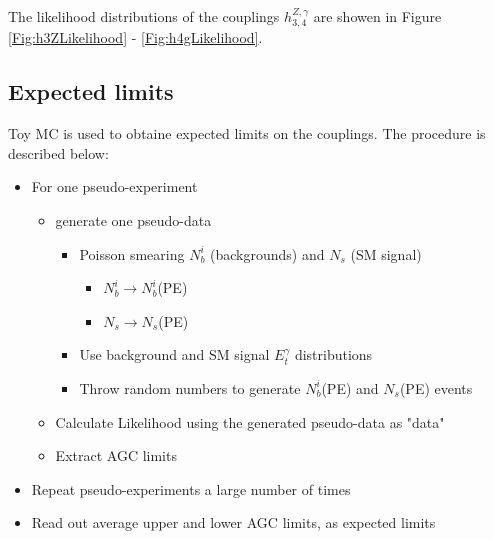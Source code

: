 \documentclass[12pt,twoside,letterpaper]{article}
\begin{document}
The likelihood distributions of the couplings $h_{3,4}^{Z,\gamma}$ are
showen in Figure \ref{Fig:h3ZLikelihood} - \ref{Fig:h4gLikelihood}.

\subsection{Expected limits}

Toy MC is used to obtaine expected limits on the couplings. The
procedure is described below:
	\begin{itemize}
\item For one pseudo-experiment
	\begin{itemize}
	   \item generate one pseudo-data
	    \begin{itemize}
	    \item Poisson smearing $N_b^i$ (backgrounds) and  $N_s$ (SM signal)
	    \begin{itemize}
	       \item $N_b^i \rightarrow N_b^i$(PE) 
	       \item $N_s \rightarrow N_s$(PE) 
	    \end{itemize}
	    \item Use background and SM signal $E_t^{\gamma}$ distributions
	    \item Throw random numbers to generate $N_b^i$(PE) and $N_s$(PE) events 
	    \end{itemize}
	    \item Calculate Likelihood using the generated pseudo-data as "data" 
	    \item Extract AGC limits
	\end{itemize}

\item Repeat pseudo-experiments a large number of times
\item Read out average upper and lower AGC limits, as expected limits
	\end{itemize}
\end{document}
